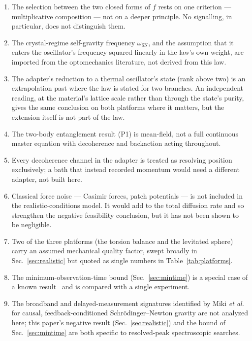 \documentclass[aps,pra,reprint,amsmath,amssymb,superscriptaddress]{revtex4-2}
\begin{document}
\begin{enumerate}
  \item The selection between the two closed forms of $f$ rests on one
    criterion --- multiplicative composition --- not on a deeper principle. No
    signalling, in particular, does not distinguish them.
  \item The crystal-regime self-gravity frequency $\omega_{\mathrm{SN}}$, and
    the assumption that it enters the oscillator's frequency squared linearly
    in the law's own weight, are imported from the optomechanics literature,
    not derived from this law.
  \item The adapter's reduction to a thermal oscillator's state (rank above
    two) is an extrapolation past where the law is stated for two branches.
    An independent reading, at the material's lattice scale rather than
    through the state's purity, gives the same conclusion on both platforms
    where it matters, but the extension itself is not part of the law.
  \item The two-body entanglement result (P1) is mean-field, not a full
    continuous master equation with decoherence and backaction acting
    throughout.
  \item Every decoherence channel in the adapter is treated as resolving
    position exclusively; a bath that instead recorded momentum would need a
    different adapter, not built here.
  \item Classical force noise --- Casimir forces, patch potentials --- is
    not included in the realistic-conditions model. It would add to the
    total diffusion rate and so strengthen the negative feasibility
    conclusion, but it has not been shown to be negligible.
  \item Two of the three platforms (the torsion balance and the levitated
    sphere) carry an assumed mechanical quality factor, swept broadly in
    Sec.~\ref{sec:realistic} but quoted as single numbers in
    Table~\ref{tab:platforms}.
  \item The minimum-observation-time bound (Sec.~\ref{sec:mintime}) is a
    special case of a known result~\cite{Helou2017} and is compared with a
    single experiment.
  \item The broadband and delayed-measurement signatures identified by Miki
    \emph{et al.}~\cite{MikiEtAl2025} for causal, feedback-conditioned
    Schr\"odinger--Newton gravity are not analyzed here; this paper's
    negative result (Sec.~\ref{sec:realistic}) and the bound of
    Sec.~\ref{sec:mintime} are both specific to resolved-peak spectroscopic
    searches.
\end{enumerate}
\end{document}
